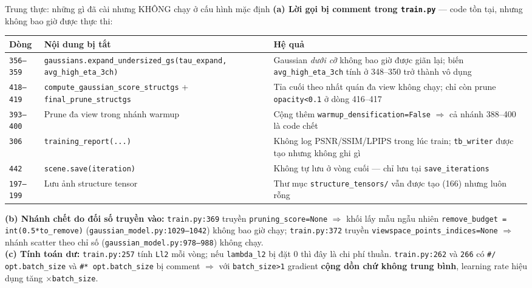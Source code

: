 \begin{frame}{\alert{Trung thực}: những gì đã cài nhưng KHÔNG chạy ở cấu hình mặc định}
\scriptsize
\textbf{(a) Lời gọi bị comment trong \texttt{train.py}} --- code tồn tại, nhưng không bao giờ được thực thi:
\begin{center}
\begin{tabular}{p{1.9cm} p{5.2cm} p{4.5cm}}
\toprule
\textbf{Dòng} & \textbf{Nội dung bị tắt} & \textbf{Hệ quả} \\
\midrule
\texttt{356--359} & \texttt{gaussians.expand\_undersized\_gs(tau\_expand, avg\_high\_eta\_3ch)} & Gaussian \emph{dưới cỡ} không bao giờ được giãn lại; biến \texttt{avg\_high\_eta\_3ch} tính ở 348--350 trở thành vô dụng \\
\texttt{418--419} & \texttt{compute\_gaussian\_score\_structgs} + \texttt{final\_prune\_structgs} & Tỉa cuối theo nhất quán đa view không chạy; chỉ còn prune \texttt{opacity<0.1} ở dòng 416--417 \\
\texttt{393--400} & Prune đa view trong nhánh warmup & Cộng thêm \texttt{warmup\_densification=False} $\Rightarrow$ cả nhánh 388--400 là code chết \\
\texttt{306} & \texttt{training\_report(...)} & Không log PSNR/SSIM/LPIPS trong lúc train; \texttt{tb\_writer} được tạo nhưng không ghi gì \\
\texttt{442} & \texttt{scene.save(iteration)} & Không tự lưu ở vòng cuối --- chỉ lưu tại \texttt{save\_iterations} \\
\texttt{197--199} & Lưu ảnh structure tensor & Thư mục \texttt{structure\_tensors/} vẫn được tạo (166) nhưng luôn rỗng \\
\bottomrule
\end{tabular}
\end{center}
\textbf{(b) Nhánh chết do đối số truyền vào:} \texttt{train.py:369} truyền \texttt{pruning\_score=None} $\Rightarrow$ khối lấy mẫu ngẫu nhiên \texttt{remove\_budget = int(0.5*to\_remove)} (\texttt{gaussian\_model.py:1029--1042}) không bao giờ chạy; \texttt{train.py:372} truyền \texttt{viewspace\_points\_indices=None} $\Rightarrow$ nhánh scatter theo chỉ số (\texttt{gaussian\_model.py:978--988}) không chạy.\\[1mm]
\textbf{(c) Tính toán dư:} \texttt{train.py:257} tính \texttt{Ll2} mỗi vòng; nếu \texttt{lambda\_l2} bị đặt $0$ thì đây là chi phí thuần. \texttt{train.py:262} và \texttt{266} có \texttt{\#/ opt.batch\_size} và \texttt{\#* opt.batch\_size} bị comment $\Rightarrow$ với \texttt{batch\_size>1} gradient \textbf{cộng dồn chứ không trung bình}, learning rate hiệu dụng tăng $\times$\texttt{batch\_size}.
\end{frame}

